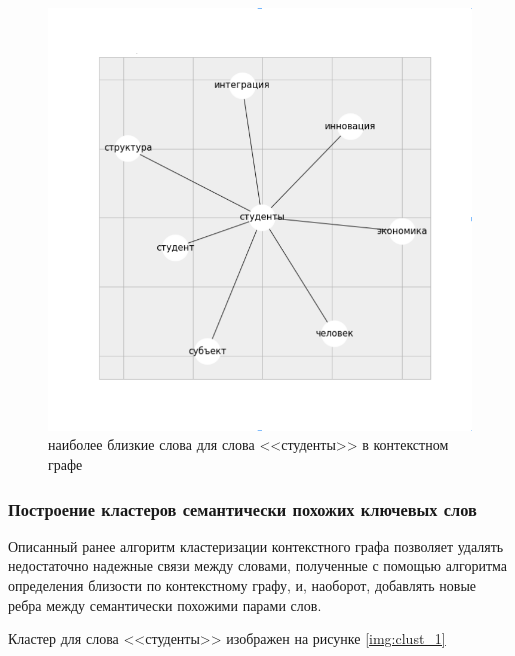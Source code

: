 \begin{figure}[ht]
  \begin{minipage}[ht]{1.0\linewidth}\centering
    \includegraphics[width=1.0\linewidth]{Dissertation/pics/students_sim}
    \caption{наиболее близкие слова для слова <<студенты>> в контекстном графе}
  \end{minipage}
  \label{img:sim_2}
\end{figure}


\subsubsection{Построение кластеров семантически похожих ключевых слов} \label{clustering_section}

Описанный ранее алгоритм кластеризации контекстного графа позволяет удалять недостаточно надежные связи между словами, полученные с помощью алгоритма определения близости по контекстному графу, и, наоборот, добавлять новые ребра между семантически похожими парами слов. 

Кластер для слова <<студенты>> изображен на рисунке \ref{img:clust_1}

